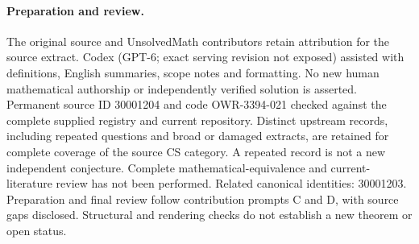 \documentclass[11pt]{article}
\begin{document}
\paragraph{Preparation and review.}
The original source and UnsolvedMath contributors retain attribution for the source extract. Codex (GPT-6; exact serving revision not exposed) assisted with definitions, English summaries, scope notes and formatting. No new human mathematical authorship or independently verified solution is asserted. Permanent source ID 30001204 and code OWR-3394-021 checked against the complete supplied registry and current repository. Distinct upstream records, including repeated questions and broad or damaged extracts, are retained for complete coverage of the source CS category. A repeated record is not a new independent conjecture. Complete mathematical-equivalence and current-literature review has not been performed. Related canonical identities: 30001203. Preparation and final review follow contribution prompts C and D, with source gaps disclosed. Structural and rendering checks do not establish a new theorem or open status.
\label{end:30001204}
\end{document}
